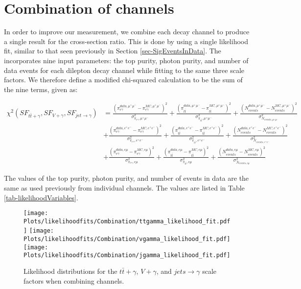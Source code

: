 \section{Combination of channels} \label{sec-CombinationOfChannels}

In order to improve our measurement, we combine each decay channel to produce a single result for the cross-section ratio. This is done by using a single likelihood fit, similar to that seen previously in Section \ref{sec-SigEventsInData}. The incorporates nine input parameters: the top purity, photon purity, and number of data events for each dilepton decay channel while fitting to the same three scale factors. We therefore define a modified chi-squared calculation to be the sum of the nine terms, given as:

\begin{equation}
\begin{split}
\chi^2(SF_{t\bar{t}+\gamma},SF_{V+\gamma},SF_{jet\to\gamma}) & = \frac{\left(\pi^{data,\mu^+\mu^-}_{e\gamma} - \pi^{MC,\mu^+\mu^-}_{e\gamma}\right)^2}{\sigma^2_{\pi_{e\gamma},\mu^+\mu^-}} + \frac{\left(\pi^{data,\mu^+\mu^-}_{t\bar{t}} - \pi^{MC,\mu^+\mu^-}_{t\bar{t}}\right)^2}{\sigma^2_{\pi_{t\bar{t}},\mu^+\mu^-}} + \frac{\left(N^{data,\mu^+\mu^-}_{events} - N^{MC,\mu^+\mu^-}_{events}\right)^2}{\sigma^2_{N_{events,\mu^+\mu^-}}} \\
& + \frac{\left(\pi^{data,e^+e^-}_{e\gamma} - \pi^{MC,e^+e^-}_{e\gamma}\right)^2}{\sigma^2_{\pi_{e\gamma},e^+e^-}} + \frac{\left(\pi^{data,e^+e^-}_{t\bar{t}} - \pi^{MC,e^+e^-}_{t\bar{t}}\right)^2}{\sigma^2_{\pi_{t\bar{t}},e^+e^-}} + \frac{\left(N^{data,e^+e^-}_{events} - N^{MC,e^+e^-}_{events}\right)^2}{\sigma^2_{N_{events,e^+e^-}}} \\
& + \frac{\left(\pi^{data,e\mu}_{e\gamma} - \pi^{MC,e\mu}_{e\gamma}\right)^2}{\sigma^2_{\pi_{e\gamma},e\mu}} + \frac{\left(\pi^{data,e\mu}_{t\bar{t}} - \pi^{MC,e\mu}_{t\bar{t}}\right)^2}{\sigma^2_{\pi_{t\bar{t}},e\mu}} + \frac{\left(N^{data,e\mu}_{events} - N^{MC,e\mu}_{events}\right)^2}{\sigma^2_{N_{events,e\mu}}} 
\end{split}
\end{equation}

The values of the top purity, photon purity, and number of events in data are the same as used previously from individual channels. The values are listed in Table \ref{tab-likelihoodVariables}.  

\begin{figure}
\texttt{[image: Plots/likelihoodfits/Combination/ttgamma\_likelihood\_fit.pdf]}
\texttt{[image: Plots/likelihoodfits/Combination/vgamma\_likelihood\_fit.pdf]}
\texttt{[image: Plots/likelihoodfits/Combination/jgamma\_likelihood\_fit.pdf]}
\caption{Likelihood distributions for the $t\bar{t}+\gamma$, $V+\gamma$, and $jets\to \gamma$ scale factors when combining channels.}
\label{fig-SFLikelihoodFitsCombination}
\end{figure}
